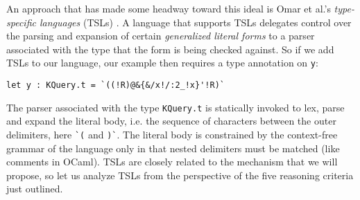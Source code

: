\documentclass[acmsmall,review,anonymous]{acmart}\settopmatter{printfolios=true,printccs=false,printacmref=false}
\newcommand{\li}[1]{\lstinline[basicstyle=\ttfamily\fontsize{9pt}{1em}\selectfont]{#1}}
\begin{document}
An approach that has made some headway toward this ideal is Omar et al.'s \emph{type-specific languages} (TSLs) \cite{TSLs}. A language that supports TSLs delegates control over the parsing and expansion of certain \emph{generalized literal forms} to a parser associated with the type that the form is being checked against. So if we add TSLs to our language, our example then requires a type annotation on \li{y}:
\begin{lstlisting}[numbers=none,basicstyle=\ttfamily\fontsize{9pt}{1em}\selectfont]
  let y : KQuery.t = `((!R)@&{&/x!/:2_!x}'!R)`
\end{lstlisting}
The parser associated with the type \li{KQuery.t} is statically invoked to lex, parse and expand the literal body, i.e. the sequence of characters between the outer delimiters, here \li{`(} and \li{)`}. The literal body is constrained by the context-free grammar of the language only in that nested delimiters must be matched (like comments in OCaml). TSLs are closely related to the mechanism that we will propose, so let us analyze TSLs from the perspective of the five reasoning criteria just outlined.
\end{document}
